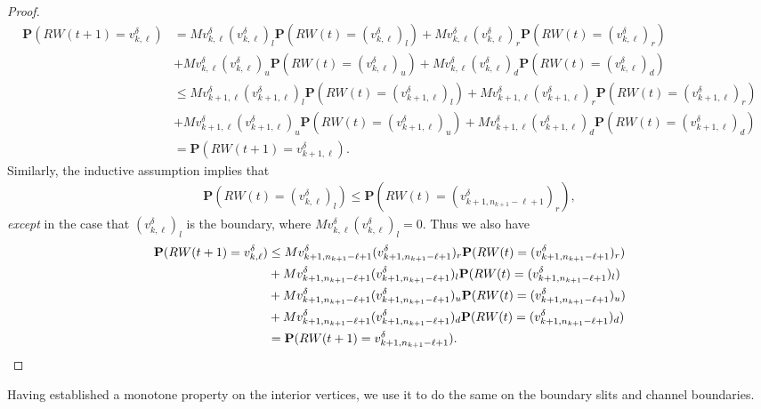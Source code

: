 \documentclass[11pt,reqno]{amsart}
\numberwithin{equation}{section}
\begin{document}
\begin{proof}
\begin{align}
\mathbf{P}(RW(t+1) = v^{\delta}_{k,\ell}) &= Mv^{\delta}_{k,\ell}(v^{\delta}_{k,\ell})_l \mathbf{P}(RW(t) = (v^{\delta}_{k,\ell})_l)
+ Mv^{\delta}_{k,\ell}(v^{\delta}_{k,\ell})_r \mathbf{P}(RW(t) = (v^{\delta}_{k,\ell})_r)\\
& + Mv^{\delta}_{k,\ell}(v^{\delta}_{k,\ell})_u \mathbf{P}(RW(t) = (v^{\delta}_{k,\ell})_u)
+ Mv^{\delta}_{k,\ell}(v^{\delta}_{k,\ell})_d \mathbf{P}(RW(t) = (v^{\delta}_{k,\ell})_d)\\
&\le Mv^{\delta}_{k+1,\ell}(v^{\delta}_{k+1,\ell})_l \mathbf{P}(RW(t) = (v^{\delta}_{k+1,\ell})_l)
+ Mv^{\delta}_{k+1,\ell}(v^{\delta}_{k+1,\ell})_r \mathbf{P}(RW(t) = (v^{\delta}_{k+1,\ell})_r)\\
& + Mv^{\delta}_{k+1,\ell}(v^{\delta}_{k+1,\ell})_u \mathbf{P}(RW(t) = (v^{\delta}_{k+1,\ell})_u)
+ Mv^{\delta}_{k+1,\ell}(v^{\delta}_{k+1,\ell})_d \mathbf{P}(RW(t) = (v^{\delta}_{k+1,\ell})_d)\\
&= \mathbf{P}(RW(t+1) = v^{\delta}_{k+1,\ell}).
\end{align}
Similarly, the inductive assumption implies that
\begin{align}
\mathbf{P}(RW(t) = (v^{\delta}_{k,\ell})_l) \le \mathbf{P}(RW(t) = (v^{\delta}_{k+1,n_{k+1}-\ell+1})_r),
\end{align}
\textit{except} in the case that $(v^{\delta}_{k,\ell})_l$ is the boundary, where $Mv^{\delta}_{k,\ell}(v^{\delta}_{k,\ell})_l = 0$.
Thus we also have
\begin{align}
\mathbf{P}(RW(t+1) = v^{\delta}_{k,\ell})
&\le Mv^{\delta}_{k+1,n_{k+1}-\ell+1}(v^{\delta}_{k+1,n_{k+1}-\ell+1})_r \mathbf{P}(RW(t) = (v^{\delta}_{k+1,n_{k+1}-\ell+1})_r) \\
&+ Mv^{\delta}_{k+1,n_{k+1}-\ell+1}(v^{\delta}_{k+1,n_{k+1}-\ell+1})_l \mathbf{P}(RW(t) = (v^{\delta}_{k+1,n_{k+1}-\ell+1})_l) \\
& + Mv^{\delta}_{k+1,n_{k+1}-\ell+1}(v^{\delta}_{k+1,n_{k+1}-\ell+1})_u \mathbf{P}(RW(t) = (v^{\delta}_{k+1,n_{k+1}-\ell+1})_u) \\
&+ Mv^{\delta}_{k+1,n_{k+1}-\ell+1}(v^{\delta}_{k+1,n_{k+1}-\ell+1})_d \mathbf{P}(RW(t) = (v^{\delta}_{k+1,n_{k+1}-\ell+1})_d)\\
&= \mathbf{P}(RW(t+1) = v^{\delta}_{k+1,n_{k+1}-\ell+1}). \qedhere
\end{align}
\end{proof}

Having established a monotone property on the interior vertices, we use it to do the same on the boundary slits and channel boundaries.
\end{document}
